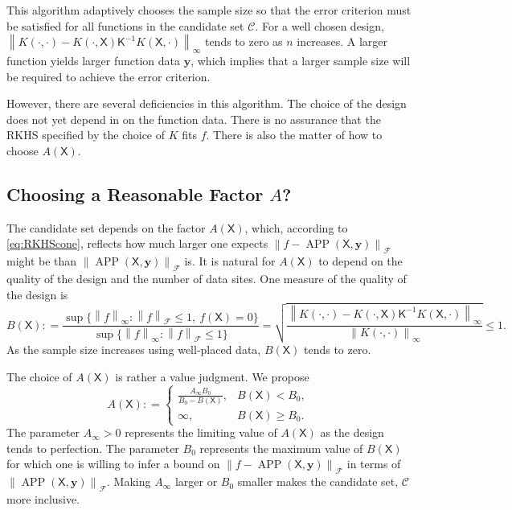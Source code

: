 \documentclass[]{mcom-l}
\theoremstyle{remark}
\DeclareMathOperator{\APP}{APP}
\newcommand{\mK}{\mathsf{K}}
\newcommand{\mX}{\mathsf{X}}
\newcommand{\by}{{\boldsymbol{y}}}
\newcommand{\cc}{\mathcal{C}}
\newcommand{\calf}{{\mathcal{F}}}
\newcommand{\norm}[2][{}]{\ensuremath{\left \lVert #2 \right \rVert}_{#1}}
\newcommand{\bignorm}[2][{}]{\ensuremath{\bigl \lVert #2 \bigr \rVert}_{#1}}
\begin{document}
This algorithm adaptively chooses the sample size so that the error criterion must be satisfied for all functions in the candidate set $\cc$.  For a well chosen design, $\norm[\infty]{K(\cdot,\cdot) - K(\cdot,\mX) \mK^{-1} K(\mX,\cdot)}$ tends to zero as $n$ increases.  A larger function yields larger function data $\by$, which implies that a larger sample size will be required to achieve the error criterion.

However, there are several deficiencies in this algorithm.  The choice of the design does not yet depend in on the function data.  There is no assurance that the RKHS specified by the choice of $K$ fits $f$.  There is also the matter of how to choose $A(\mX)$.


\subsection{Choosing a Reasonable Factor $A$?}

The candidate set depends on the factor $A(\mX)$, which, according to \ref{eq:RKHScone}, reflects how much larger one expects $\bignorm[\calf]{f  - \APP(\mX,\by)}$ might be than $\bignorm[\calf]{\APP(\mX,\by)}$ is.  It is natural for $A(\mX)$ to depend  on the quality of the design and the number of data sites.  One measure of the quality of the design is 
\begin{equation} \label{eq:BX}
B(\mX) : = \frac{ \sup \{\norm[\infty]{f} :  \norm[\calf]{f}  \le 1 , \ f(\mX) = 0 \}   }  {\sup \{ \norm[\infty]{f}  : \norm[\calf]{f}  \le 1  \} }
= \sqrt{ \frac{\norm[\infty]{K(\cdot,\cdot) - K(\cdot,\mX) \mK^{-1} K(\mX,\cdot)}}{\norm[\infty]{K(\cdot,\cdot)}}} \le 1.
\end{equation}
As the sample size increases using well-placed data, $B(\mX)$ tends to zero.

The choice of $A(\mX)$ is rather a value judgment.  We propose
\begin{equation} \label{eq:an}
A(\mX): = \begin{cases} \displaystyle
\frac{A_\infty B_0}{B_0 - B(\mX)}, & B(\mX) < B_0, \\
\infty, & B(\mX) \ge B_0.
\end{cases}
\end{equation}
The parameter $A_\infty > 0$ represents the limiting value of $A(\mX)$ as the design tends to perfection.  The parameter $B_0$ represents the maximum value of $B(\mX)$ for which one is willing to infer a bound on $\bignorm[\calf]{f  - \APP(\mX,\by)}$ in terms of $\bignorm[\calf]{\APP(\mX,\by)}$.  Making $A_\infty$ larger or $B_0$ smaller makes the candidate set, $\cc$ more inclusive.
\end{document}
